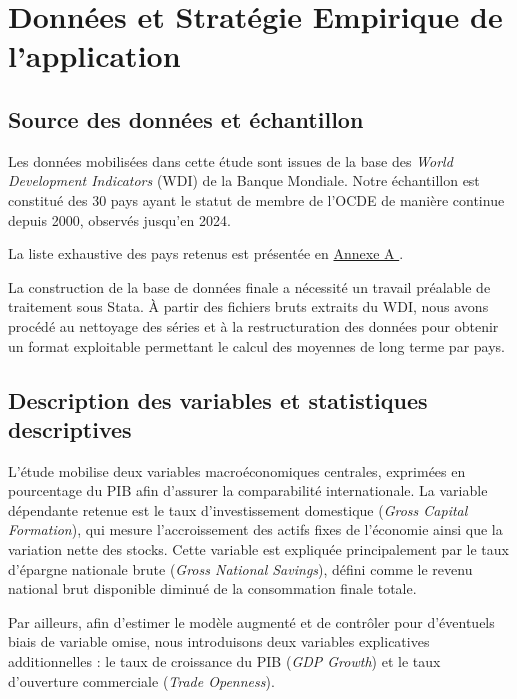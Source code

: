 \documentclass[12pt, a4paper]{article}
\begin{document}
\section{Données et Stratégie Empirique de l'application}

\subsection{Source des données et échantillon}

Les données mobilisées dans cette étude sont issues de la base des \textit{World Development Indicators} (WDI) de la Banque Mondiale. Notre échantillon est constitué des 30 pays ayant le statut de membre de l'OCDE de manière continue depuis 2000, observés jusqu'en 2024.

La liste exhaustive des pays retenus est présentée en \hyperref[annexe:pays]{Annexe A }.

La construction de la base de données finale a nécessité un travail préalable de traitement sous Stata. À partir des fichiers bruts extraits du WDI, nous avons procédé au nettoyage des séries et à la restructuration des données pour obtenir un format exploitable permettant le calcul des moyennes de long terme par pays.

\subsection{Description des variables et statistiques descriptives}

L’étude mobilise deux variables macroéconomiques centrales, exprimées en pourcentage du PIB afin d'assurer la comparabilité internationale. La variable dépendante retenue est le taux d’investissement domestique (\textit{Gross Capital Formation}), qui mesure l’accroissement des actifs fixes de l’économie ainsi que la variation nette des stocks. Cette variable est expliquée principalement par le taux d’épargne nationale brute (\textit{Gross National Savings}), défini comme le revenu national brut disponible diminué de la consommation finale totale.

Par ailleurs, afin d'estimer le modèle augmenté et de contrôler pour d'éventuels biais de variable omise, nous introduisons deux variables explicatives additionnelles : le taux de croissance du PIB (\textit{GDP Growth}) et le taux d'ouverture commerciale (\textit{Trade Openness}).
\end{document}

